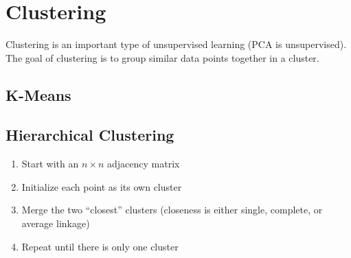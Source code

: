 \documentclass[10pt]{report}
\begin{document}
\chapter{Clustering}
Clustering is an important type of unsupervised learning (PCA is unsupervised). The goal of clustering is to group similar data points together in a cluster.

\section{K-Means}
\section{Hierarchical Clustering}
\begin{enumerate}
  \item Start with an $n \times n$ adjacency matrix
  \item Initialize each point as its own cluster
  \item Merge the two ``closest'' clusters (closeness is either single, complete, or average linkage)
  \item Repeat until there is only one cluster
\end{enumerate}
\end{document}
